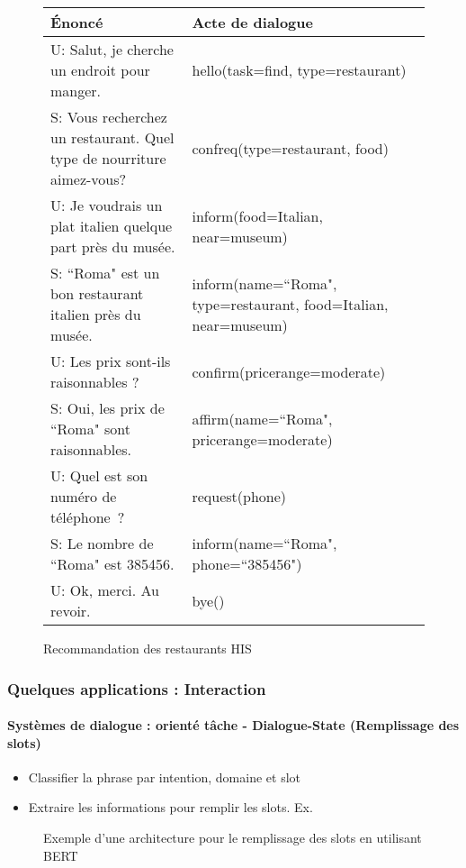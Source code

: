 \documentclass[xcolor=table]{beamer}
\begin{document}
\begin{frame}
\begin{figure}
		\begin{tabular}{p{}p{}}
			\hline
			Énoncé & Acte de dialogue \\
			\hline
			U: Salut, je cherche un endroit pour manger.  & hello(task=find, type=restaurant) \\
			S: Vous recherchez un restaurant. Quel type de nourriture aimez-vous?  & confreq(type=restaurant, food) \\
			U: Je voudrais un plat italien quelque part près du musée.  & inform(food=Italian, near=museum)\\
			S: ``Roma" est un bon restaurant italien près du musée.  & inform(name=``Roma", type=restaurant, food=Italian, near=museum) \\
			U: Les prix sont-ils raisonnables ? & confirm(pricerange=moderate) \\
			S: Oui, les prix de ``Roma" sont raisonnables.  & affirm(name=``Roma", pricerange=moderate) \\
			U: Quel est son numéro de téléphone ? & request(phone) \\
			S: Le nombre de ``Roma" est 385456. & inform(name=``Roma", phone=``385456") \\
			U: Ok, merci. Au revoir. & bye() \\
			\hline
		\end{tabular}
		
		\caption{\vspace{-1cm}Recommandation des restaurants HIS \cite{2010-young-al}}
	\end{figure}
	
\end{frame}

\begin{frame}
	\frametitle{Quelques applications : Interaction}
	\framesubtitle{Systèmes de dialogue : orienté tâche - Dialogue-State (Remplissage des slots)}
	
	\begin{itemize}
		\item Classifier la phrase par intention, domaine et slot
		\item Extraire les informations pour remplir les slots. Ex. 
	\end{itemize}
	
	\begin{figure}
		\centering
		\caption{Exemple d'une architecture pour le remplissage des slots en utilisant BERT \cite{2020-jurafsky-martin}}
	\end{figure}
	
\end{frame}
\end{document}
